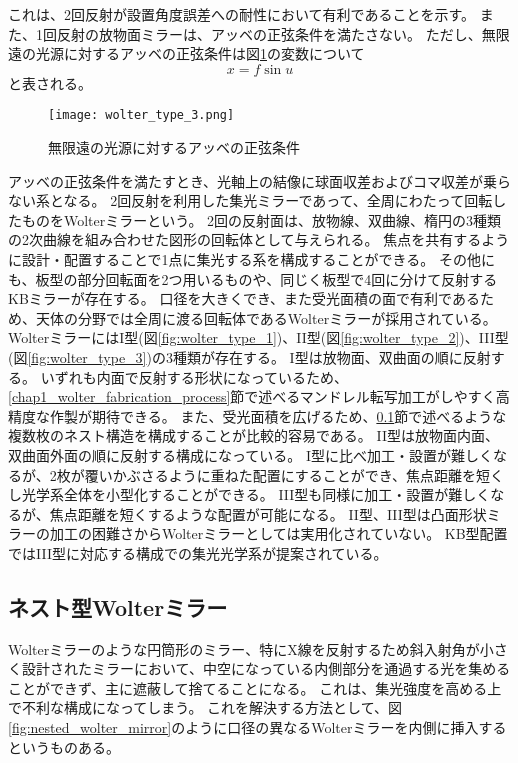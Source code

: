 これは、2回反射が設置角度誤差への耐性において有利であることを示す。
また、1回反射の放物面ミラーは、アッベの正弦条件を満たさない。
ただし、無限遠の光源に対するアッベの正弦条件は図\ref{fig:abbe_sine_condition_for_parallel_light}の変数について
\[
    x = f \sin u
\]
と表される。

\begin{figure}[b]
\centering
\texttt{[image: wolter\_type\_3.png]}
\caption{無限遠の光源に対するアッベの正弦条件}
\label{fig:abbe_sine_condition_for_parallel_light}
\end{figure}

アッベの正弦条件を満たすとき、光軸上の結像に球面収差およびコマ収差が乗らない系となる。
2回反射を利用した集光ミラーであって、全周にわたって回転したものをWolterミラーという。
2回の反射面は、放物線、双曲線、楕円の3種類の2次曲線を組み合わせた図形の回転体として与えられる。
焦点を共有するように設計・配置することで1点に集光する系を構成することができる。
その他にも、板型の部分回転面を2つ用いるものや、同じく板型で4回に分けて反射するKBミラーが存在する。
口径を大きくでき、また受光面積の面で有利であるため、天体の分野では全周に渡る回転体であるWolterミラーが採用されている。
WolterミラーにはI型(図\ref{fig:wolter_type_1})、II型(図\ref{fig:wolter_type_2})、III型(図\ref{fig:wolter_type_3})の3種類が存在する。
I型は放物面、双曲面の順に反射する。
いずれも内面で反射する形状になっているため、\ref{chap1_wolter_fabrication_process}節で述べるマンドレル転写加工がしやすく高精度な作製が期待できる。
また、受光面積を広げるため、\ref{chap1_nested_wolter_mirror}節で述べるような複数枚のネスト構造を構成することが比較的容易である。
II型は放物面内面、双曲面外面の順に反射する構成になっている。
I型に比べ加工・設置が難しくなるが、2枚が覆いかぶさるように重ねた配置にすることができ、焦点距離を短くし光学系全体を小型化することができる。
III型も同様に加工・設置が難しくなるが、焦点距離を短くするような配置が可能になる。
II型、III型は凸面形状ミラーの加工の困難さからWolterミラーとしては実用化されていない。
KB型配置ではIII型に対応する構成での集光光学系が提案されている。\cite{Yamada:20}

\subsection{ネスト型Wolterミラー}
\label{chap1_nested_wolter_mirror}

Wolterミラーのような円筒形のミラー、特にX線を反射するため斜入射角が小さく設計されたミラーにおいて、中空になっている内側部分を通過する光を集めることができず、主に遮蔽して捨てることになる。
これは、集光強度を高める上で不利な構成になってしまう。
これを解決する方法として、図\ref{fig:nested_wolter_mirror}のように口径の異なるWolterミラーを内側に挿入するというものある。


